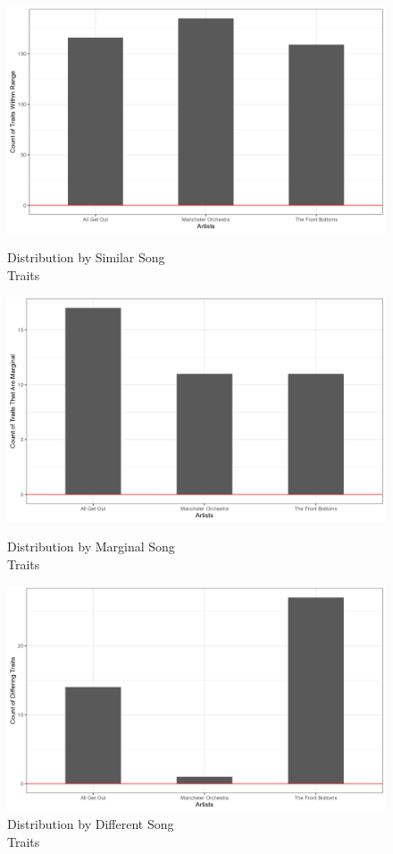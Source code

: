 \documentclass{article}\usepackage[]{graphicx}\usepackage[]{xcolor}
\begin{document}
\begin{figure}[h]
  \begin{minipage}{0.35\textwidth}
    \includegraphics[width=\textwidth]{SimilarTraits.png}  
    \caption{Distribution by Similar Song \\ Traits}
    \label{fig:example}
   \end{minipage}
   \begin{minipage}{0.35\textwidth}
    \includegraphics[width=\textwidth]{MarginalTraits.png}  
    \caption{Distribution by Marginal Song \\ Traits}
    \label{fig:example}
   \end{minipage}
   \begin{minipage}{0.35\textwidth}
    \includegraphics[width=\textwidth]{DifferentTraits.png} 
    \caption{Distribution by Different Song \\ Traits}
    \label{fig:example}
   \end{minipage}
\end{figure}
\end{document}

